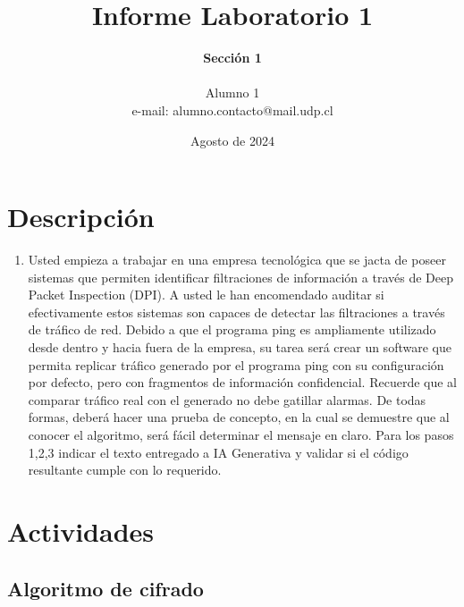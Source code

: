 \documentclass[letter,12pt]{article}
\begin{document}
%
   \title{\Huge{Informe Laboratorio 1}}

   \author{\textbf{Sección 1} \\  \\Alumno 1 \\ e-mail: alumno.contacto@mail.udp.cl}
          
   \date{Agosto de 2024}

   \maketitle
   
   \tableofcontents
 
  \newpage
  

\section{Descripción}

\begin{enumerate}
    \item  Usted empieza a trabajar en una empresa tecnológica que se jacta de poseer sistemas que permiten identificar filtraciones de información a través de Deep Packet Inspection (DPI).
    A usted le han encomendado auditar si efectivamente estos sistemas son capaces de detectar las filtraciones a través de tráfico de red. Debido a que el programa ping es ampliamente utilizado desde dentro y hacia fuera de la empresa, su tarea será crear un software que permita replicar tráfico generado por el programa ping con su configuración por defecto, pero con fragmentos de información confidencial. Recuerde que al comparar tráfico real con el generado no debe gatillar alarmas.
    De todas formas, deberá hacer una prueba de concepto, en la cual se demuestre que al conocer el algoritmo, será fácil determinar el mensaje en claro.
    Para los pasos 1,2,3 indicar el texto entregado a IA Generativa y validar si el código resultante cumple con lo requerido.
\end{enumerate}


\section{Actividades}


\subsection{Algoritmo de cifrado}
\end{document}
